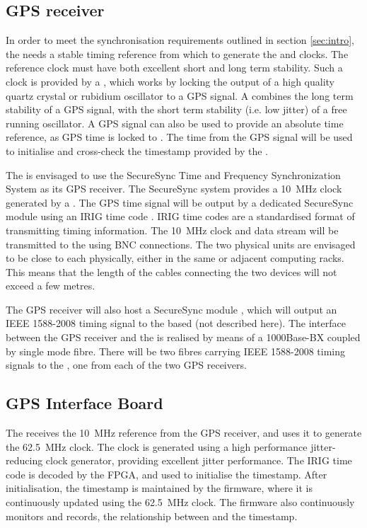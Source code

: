 \documentclass{dune}
\begin{document}
\subsection{GPS receiver}
In order to meet the synchronisation requirements outlined in section \ref{sec:intro}, the  needs a stable timing reference from which to generate the  and  clocks. The reference clock must have both excellent short and long term stability. Such a clock is provided by a , which works by locking the output of a high quality quartz crystal or rubidium oscillator to a GPS signal. A  combines the long term stability of a GPS signal, with the short term stability (i.e. low jitter) of a free running oscillator. A GPS signal can also be used to provide an absolute time reference, as GPS time is locked to . The time from the GPS signal will be used to initialise and cross-check the timestamp provided by the .

The  is envisaged to use the SecureSync Time and Frequency Synchronization System \cite{secure_sync_datasheet} as its GPS receiver. The SecureSync system provides a \SI{10}{\MHz} clock generated by a . The GPS time signal will be output by a dedicated SecureSync module \cite{secure_sync_modules} using an IRIG time code \cite{irig}. IRIG time codes are a standardised format of transmitting timing information. The \SI{10}{\MHz} clock and  data stream will be transmitted to the  using BNC connections. The two physical units are envisaged to be close to each physically, either in the same or adjacent computing racks. This means that the length of the cables connecting the two devices will not exceed a few metres.

The GPS receiver will also host a SecureSync module \cite{secure_sync_modules}, which will output an IEEE 1588-2008 \cite{ieee_1588_2008} timing signal to the  \cite{wr_ohwr} based  (not described here). The interface between the GPS receiver and the  is realised by means of a 1000Base-BX  coupled by single mode fibre. There will be two fibres carrying IEEE 1588-2008 timing signals to the , one from each of the two GPS receivers.

\subsection{GPS Interface Board}
The  receives the \SI{10}{\MHz} reference from the GPS receiver, and uses it to generate the \SI{62.5}{\MHz}  clock. The clock is generated using a high performance jitter-reducing clock generator, providing excellent jitter performance. The IRIG time code is decoded by the  FPGA, and used to initialise the  timestamp. After initialisation, the  timestamp is maintained by the  firmware, where it is continuously updated using the \SI{62.5}{\MHz} clock. The firmware also continuously monitors and records, the relationship between  and the  timestamp.
\end{document}
